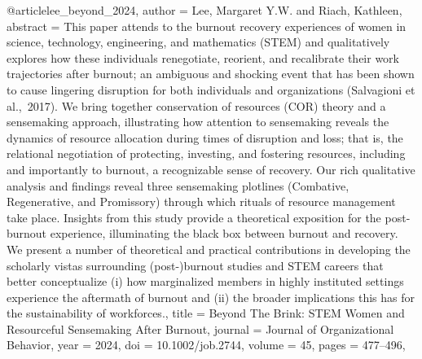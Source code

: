 @article{lee_beyond_2024,
  author = {Lee, Margaret Y.W. and Riach, Kathleen},
  abstract = {This paper attends to the burnout recovery experiences of women in science, technology, engineering, and mathematics (STEM) and qualitatively explores how these individuals renegotiate, reorient, and recalibrate their work trajectories after burnout; an ambiguous and shocking event that has been shown to cause lingering disruption for both individuals and organizations (Salvagioni et al., 2017). We bring together conservation of resources (COR) theory and a sensemaking approach, illustrating how attention to sensemaking reveals the dynamics of resource allocation during times of disruption and loss; that is, the relational negotiation of protecting, investing, and fostering resources, including and importantly to burnout, a recognizable sense of recovery. Our rich qualitative analysis and findings reveal three sensemaking plotlines (Combative, Regenerative, and Promissory) through which rituals of resource management take place. Insights from this study provide a theoretical exposition for the post-burnout experience, illuminating the black box between burnout and recovery. We present a number of theoretical and practical contributions in developing the scholarly vistas surrounding (post-)burnout studies and STEM careers that better conceptualize (i) how marginalized members in highly instituted settings experience the aftermath of burnout and (ii) the broader implications this has for the sustainability of workforces.},
  title = {{Beyond} {The} {Brink}: {STEM} {Women} {and} {Resourceful} {Sensemaking} {After} {Burnout}},
  journal = {Journal of Organizational Behavior},
  year = {2024},
  doi = {10.1002/job.2744},
  volume = {45},
  pages = {477--496},
}


